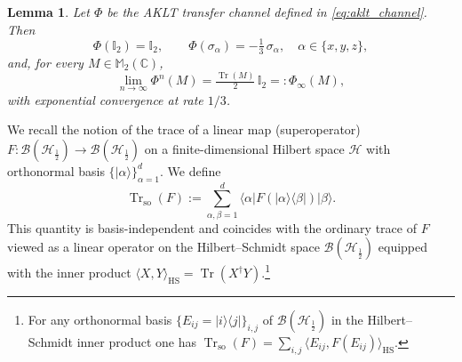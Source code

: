 \documentclass[11pt,a4paper]{article}
\newtheorem{lemma}[theorem]{Lemma}
\begin{document}
\begin{lemma}\label{lem:aklt_conv}
Let $\Phi$ be the AKLT  transfer channel defined in \eqref{eq:aklt_channel}. Then
\[
\Phi(\mathbb{I}_2)=\mathbb{I}_2,
\qquad
\Phi(\sigma_\alpha)=-\tfrac{1}{3}\,\sigma_\alpha,\quad \alpha\in\{x,y,z\},
\]
and, for every $M\in\mathbb{M}_2(\mathbb{C})$,
\begin{equation}\label{eq:Phi_power_limit}
\lim_{n\to\infty}\Phi^{n}(M)=\tfrac{\operatorname{Tr}(M)}{2}\,\mathbb{I}_2 = : \Phi_{\infty}(M),
\end{equation}
with exponential convergence at rate $1/3$.
\end{lemma}



We recall the notion of the trace of a linear map (superoperator)
\(F:\mathcal{B}(\mathcal{H}_{\frac{1}{2}})\to\mathcal{B}(\mathcal{H}_{\frac{1}{2}})\) on a finite-dimensional Hilbert space
\(\mathcal{H}\) with orthonormal basis \(\{|\alpha\rangle\}_{\alpha=1}^{d}\). We define
\begin{equation}\label{eq:superop_trace_def}
\operatorname{Tr}_{\mathrm{so}}(F)
:=
\sum_{\alpha,\beta=1}^{d}
\langle \alpha|F(|\alpha\rangle\langle\beta|)|\beta\rangle.
\end{equation}
This quantity is basis-independent and coincides with the ordinary trace of \(F\) viewed as a linear operator on the Hilbert–Schmidt space \(\mathcal{B}(\mathcal{H}_{\frac{1}{2}})\) equipped with the inner product \(\langle X,Y\rangle_{\mathrm{HS}}=\operatorname{Tr}(X^{\dagger}Y)\).\footnote{For any orthonormal basis \(\{E_{ij}=|i\rangle\langle j|\}_{i,j}\) of \(\mathcal{B}(\mathcal{H}_{\frac{1}{2}})\) in the Hilbert–Schmidt inner product one has \(\operatorname{Tr}_{\mathrm{so}}(F)=\sum_{i,j}\langle E_{ij},F(E_{ij})\rangle_{\mathrm{HS}}\).}
\end{document}
